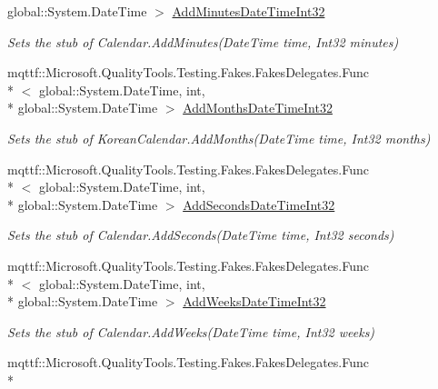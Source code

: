 \begin{DoxyCompactItemize}
global\-::\-System.\-Date\-Time $>$ \hyperlink{class_system_1_1_globalization_1_1_fakes_1_1_stub_korean_calendar_ade73c0c51374df91e7d052f2c1735f65}{Add\-Minutes\-Date\-Time\-Int32}
\begin{DoxyCompactList}\small\item\em Sets the stub of Calendar.\-Add\-Minutes(\-Date\-Time time, Int32 minutes)\end{DoxyCompactList}\item 
mqttf\-::\-Microsoft.\-Quality\-Tools.\-Testing.\-Fakes.\-Fakes\-Delegates.\-Func\\*
$<$ global\-::\-System.\-Date\-Time, int, \\*
global\-::\-System.\-Date\-Time $>$ \hyperlink{class_system_1_1_globalization_1_1_fakes_1_1_stub_korean_calendar_a7e43f274fc6e08346ea90f929a0ae5c6}{Add\-Months\-Date\-Time\-Int32}
\begin{DoxyCompactList}\small\item\em Sets the stub of Korean\-Calendar.\-Add\-Months(\-Date\-Time time, Int32 months)\end{DoxyCompactList}\item 
mqttf\-::\-Microsoft.\-Quality\-Tools.\-Testing.\-Fakes.\-Fakes\-Delegates.\-Func\\*
$<$ global\-::\-System.\-Date\-Time, int, \\*
global\-::\-System.\-Date\-Time $>$ \hyperlink{class_system_1_1_globalization_1_1_fakes_1_1_stub_korean_calendar_a6634ca5d9c4ff268b5b1821b42051917}{Add\-Seconds\-Date\-Time\-Int32}
\begin{DoxyCompactList}\small\item\em Sets the stub of Calendar.\-Add\-Seconds(\-Date\-Time time, Int32 seconds)\end{DoxyCompactList}\item 
mqttf\-::\-Microsoft.\-Quality\-Tools.\-Testing.\-Fakes.\-Fakes\-Delegates.\-Func\\*
$<$ global\-::\-System.\-Date\-Time, int, \\*
global\-::\-System.\-Date\-Time $>$ \hyperlink{class_system_1_1_globalization_1_1_fakes_1_1_stub_korean_calendar_ae31f95f52a40c0fa827cfd8c4adaface}{Add\-Weeks\-Date\-Time\-Int32}
\begin{DoxyCompactList}\small\item\em Sets the stub of Calendar.\-Add\-Weeks(\-Date\-Time time, Int32 weeks)\end{DoxyCompactList}\item 
mqttf\-::\-Microsoft.\-Quality\-Tools.\-Testing.\-Fakes.\-Fakes\-Delegates.\-Func\\*

\end{DoxyCompactItemize}
